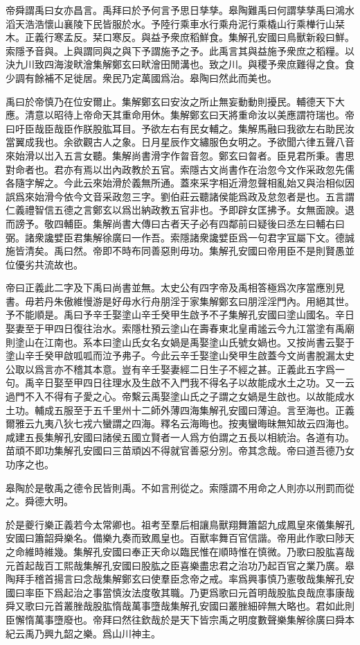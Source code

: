 帝舜謂禹曰女亦昌言。禹拜曰於予何言予思日孳孳。皋陶難禹曰何謂孳孳禹曰鴻水滔天浩浩懷山襄陵下民皆服於水。予陸行乘車水行乘舟泥行乘橇山行乘檋行山栞木。正義行寒孟反。栞口寒反。與益予衆庶稻鮮食。集解孔安國曰鳥獸新殺曰鮮。索隱予音與。上與謂同與之與下予謂施予之予。此禹言其與益施予衆庶之稻糧。以決九川致四海浚畎澮集解鄭玄曰畎澮田閒溝也。致之川。與稷予衆庶難得之食。食少調有餘補不足徙居。衆民乃定萬國爲治。皋陶曰然此而美也。

禹曰於帝慎乃在位安爾止。集解鄭玄曰安汝之所止無妄動動則擾民。輔德天下大應。清意以昭待上帝命天其重命用休。集解鄭玄曰天將重命汝以美應謂符瑞也。帝曰吁臣哉臣哉臣作朕股肱耳目。予欲左右有民女輔之。集解馬融曰我欲左右助民汝當翼成我也。余欲觀古人之象。日月星辰作文繡服色女明之。予欲聞六律五聲八音來始滑以岀入五言女聽。集解尚書滑字作曶音忽。鄭玄曰曶者。臣見君所秉。書思對命者也。君亦有焉以岀內政教於五官。索隱古文尚書作在治忽今文作采政忽先儒各隨字解之。今此云來始滑於義無所通。蓋來采字相近滑忽聲相亂始又與治相似因誤爲來始滑今依今文音采政忽三字。劉伯莊云聽諸侯能爲政及怠忽者是也。五言謂仁義禮智信五德之言鄭玄以爲岀納政教五官非也。予即辟女匡拂予。女無面諛。退而謗予。敬四輔臣。集解尚書大傳曰古者天子必有四鄰前曰疑後曰丞左曰輔右曰弼。諸衆讒嬖臣君集解徐廣曰一作吾。索隱諸衆讒嬖臣爲一句君字冝屬下文。德誠施皆清矣。禹曰然。帝即不時布同善惡則毋功。集解孔安國曰帝用臣不是則賢愚並位優劣共流故也。

帝曰正義此二字及下禹曰尚書並無。太史公有四字帝及禹相答極爲次序當應別見書。毋若丹朱傲維慢游是好毋水行舟朋淫于家集解鄭玄曰朋淫淫門內。用絕其世。予不能順是。禹曰予辛壬娶塗山辛壬癸甲生啟予不子集解孔安國曰塗山國名。辛日娶妻至于甲四日復往治水。索隱杜預云塗山在壽春東北皇甫謐云今九江當塗有禹廟則塗山在江南也。系本曰塗山氏女名女媧是禹娶塗山氏號女媧也。又按尚書云娶于塗山辛壬癸甲啟呱呱而泣予弗子。今此云辛壬娶塗山癸甲生啟蓋今文尚書脫漏太史公取以爲言亦不稽其本意。豈有辛壬娶妻經二日生子不經之甚。正義此五字爲一句。禹辛日娶至甲四日往理水及生啟不入門我不得名子以故能成水土之功。又一云過門不入不得有子愛之心。帝繫云禹娶塗山氏之子謂之女媧是生啟也。以故能成水土功。輔成五服至于五千里州十二師外薄四海集解孔安國曰薄迫。言至海也。正義爾雅云九夷八狄七戎六蠻謂之四海。釋名云海晦也。按夷蠻晦昧無知故云四海也。咸建五長集解孔安國曰諸侯五國立賢者一人爲方伯謂之五長以相統治。各道有功。苗頑不即功集解孔安國曰三苗頑凶不得就官善惡分別。帝其念哉。帝曰道吾德乃女功序之也。

皋陶於是敬禹之德令民皆則禹。不如言刑從之。索隱謂不用命之人則亦以刑罰而從之。舜德大明。

於是夔行樂正義若今太常卿也。祖考至羣后相讓鳥獸翔舞簫韶九成鳳皇來儀集解孔安國曰簫韶舜樂名。備樂九奏而致鳳皇也。百獸率舞百官信諧。帝用此作歌曰陟天之命維時維幾。集解孔安國曰奉正天命以臨民惟在順時惟在慎微。乃歌曰股肱喜哉元首起哉百工熙哉集解孔安國曰股肱之臣喜樂盡忠君之治功乃起百官之業乃廣。皋陶拜手稽首揚言曰念哉集解鄭玄曰使羣臣念帝之戒。率爲興事慎乃憲敬哉集解孔安國曰率臣下爲起治之事當慎汝法度敬其職。乃更爲歌曰元首明哉股肱良哉庶事康哉舜又歌曰元首叢脞哉股肱惰哉萬事墮哉集解孔安國曰叢脞細碎無大略也。君如此則臣懈惰萬事墮廢也。帝拜曰然往欽哉於是天下皆宗禹之明度數聲樂集解徐廣曰舜本紀云禹乃興九韶之樂。爲山川神主。

